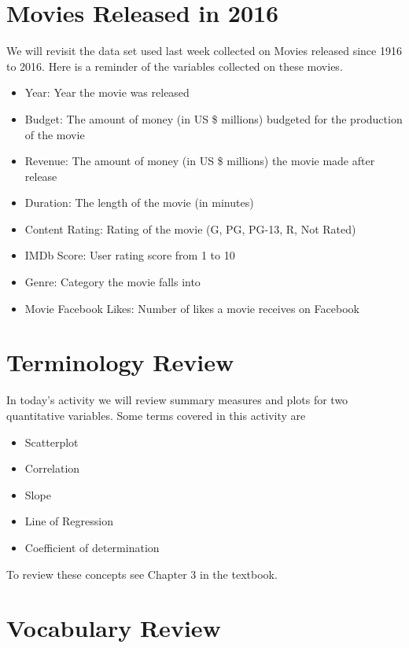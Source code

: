 \documentclass[
]{report}
\begin{document}
\hypertarget{movies-released-in-2016}{%
\section{Movies Released in 2016}\label{movies-released-in-2016}}

We will revisit the data set used last week collected on Movies released since 1916 to 2016. Here is a reminder of the variables collected on these movies.

\begin{itemize}
\item
  Year: Year the movie was released
\item
  Budget: The amount of money (in US \$ millions) budgeted for the production of the movie
\item
  Revenue: The amount of money (in US \$ millions) the movie made after release
\item
  Duration: The length of the movie (in minutes)
\item
  Content Rating: Rating of the movie (G, PG, PG-13, R, Not Rated)
\item
  IMDb Score: User rating score from 1 to 10
\item
  Genre: Category the movie falls into
\item
  Movie Facebook Likes: Number of likes a movie receives on Facebook
\end{itemize}

\hypertarget{terminology-review}{%
\section{Terminology Review}\label{terminology-review}}

In today's activity we will review summary measures and plots for two quantitative variables. Some terms covered in this activity are

\begin{itemize}
\item
  Scatterplot
\item
  Correlation
\item
  Slope
\item
  Line of Regression
\item
  Coefficient of determination
\end{itemize}

To review these concepts see Chapter 3 in the textbook.

\hypertarget{vocabulary-review}{%
\section{Vocabulary Review}\label{vocabulary-review}}
\end{document}
